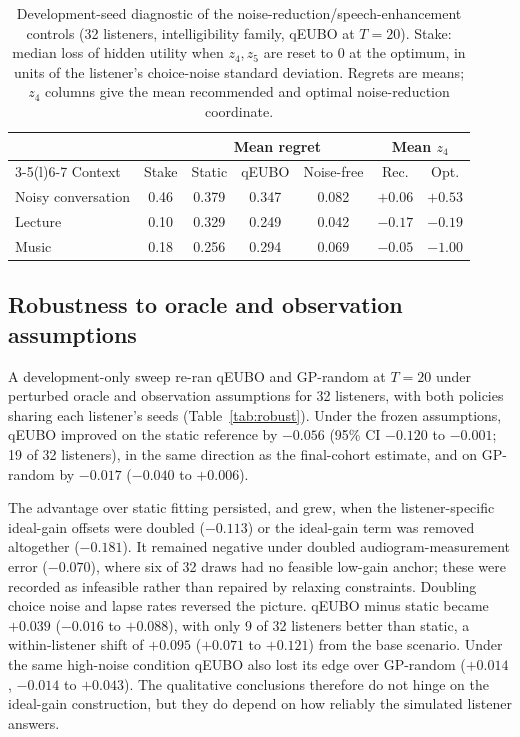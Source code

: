\documentclass[preprint,12pt]{elsarticle}
\begin{document}
\begin{table}[!htbp]
\centering
\caption{Development-seed diagnostic of the noise-reduction/speech-enhancement controls (32 listeners, intelligibility family, qEUBO at $T=20$). Stake: median loss of hidden utility when $z_4,z_5$ are reset to 0 at the optimum, in units of the listener's choice-noise standard deviation. Regrets are means; $z_4$ columns give the mean recommended and optimal noise-reduction coordinate.}
\label{tab:nrse}
\small
\begin{tabular}{@{}lcccccc@{}}
\toprule
 & & \multicolumn{3}{c}{Mean regret} & \multicolumn{2}{c}{Mean $z_4$} \\
\cmidrule(lr){3-5}\cmidrule(l){6-7}
Context & Stake & Static & qEUBO & Noise-free & Rec. & Opt. \\
\midrule
Noisy conversation & 0.46 & 0.379 & 0.347 & 0.082 & $+0.06$ & $+0.53$ \\
Lecture & 0.10 & 0.329 & 0.249 & 0.042 & $-0.17$ & $-0.19$ \\
Music & 0.18 & 0.256 & 0.294 & 0.069 & $-0.05$ & $-1.00$ \\
\bottomrule
\end{tabular}
\end{table}

\subsection{Robustness to oracle and observation assumptions}
\label{sec:robust}

A development-only sweep re-ran qEUBO and GP-random at $T=20$ under perturbed oracle and observation assumptions for 32 listeners, with both policies sharing each listener's seeds (Table~\ref{tab:robust}). Under the frozen assumptions, qEUBO improved on the static reference by $-0.056$ (95\% CI $-0.120$ to $-0.001$; 19 of 32 listeners), in the same direction as the final-cohort estimate, and on GP-random by $-0.017$ ($-0.040$ to $+0.006$).

The advantage over static fitting persisted, and grew, when the listener-specific ideal-gain offsets were doubled ($-0.113$) or the ideal-gain term was removed altogether ($-0.181$). It remained negative under doubled audiogram-measurement error ($-0.070$), where six of 32 draws had no feasible low-gain anchor; these were recorded as infeasible rather than repaired by relaxing constraints. Doubling choice noise and lapse rates reversed the picture. qEUBO minus static became $+0.039$ ($-0.016$ to $+0.088$), with only 9 of 32 listeners better than static, a within-listener shift of $+0.095$ ($+0.071$ to $+0.121$) from the base scenario. Under the same high-noise condition qEUBO also lost its edge over GP-random ($+0.014$, $-0.014$ to $+0.043$). The qualitative conclusions therefore do not hinge on the ideal-gain construction, but they do depend on how reliably the simulated listener answers.
\end{document}
